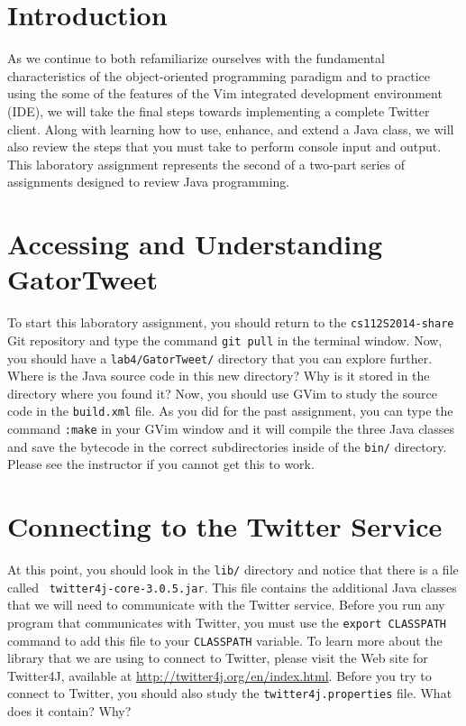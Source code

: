 


\usepackage[compact]{titlesec}



\section*{Introduction}

As we continue to both refamiliarize ourselves with the fundamental characteristics of the object-oriented programming paradigm
and to practice using the some of the features of the Vim integrated development environment (IDE), we will take the final steps
towards implementing a complete Twitter client.  Along with learning how to use, enhance, and extend a Java class, we will also
review the steps that you must take to perform console input and output. This laboratory assignment represents the second of a
two-part series of assignments designed to review Java programming.

\section*{Accessing and Understanding GatorTweet}

To start this laboratory assignment, you should return to the {\tt cs112S2014-share} Git repository and type the command {\tt git
  pull} in the terminal window.  Now, you should have a {\tt lab4/GatorTweet/} directory that you can explore further.  Where is
the Java source code in this new directory? Why is it stored in the directory where you found it? Now, you should use GVim to
study the source code in the {\tt build.xml} file.  As you did for the past assignment, you can type the command {\tt :make} in
your GVim window and it will compile the three Java classes and save the bytecode in the correct subdirectories inside of the
{\tt bin/} directory.  Please see the instructor if you cannot get this to work.

\section*{Connecting to the Twitter Service}

\begin{sloppypar} At this point, you should look in the {\tt lib/} directory and notice that there is a file called {\tt
    twitter4j-core-3.0.5.jar}.  This file contains the additional Java classes that we will need to communicate with the Twitter
  service. Before you run any program that communicates with Twitter, you must use the {\tt export CLASSPATH} command to add this
  file to your {\tt CLASSPATH} variable.  To learn more about the library that we are using to connect to Twitter, please visit
  the Web site for Twitter4J, available at \url{http://twitter4j.org/en/index.html}. Before you try to connect to Twitter,
  you should also study the {\tt twitter4j.properties} file. What does it contain? Why?  \end{sloppypar}

